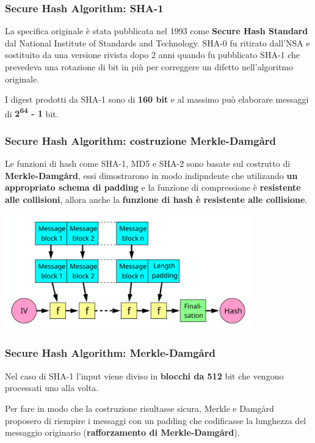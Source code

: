 \begin{frame}
	\frametitle{Secure Hash Algorithm: SHA-1}

	La specifica originale è stata pubblicata nel 1993 come \textbf{Secure Hash Standard} dal National Institute of Standards and Technology.
	SHA-0 fu ritirato dall'NSA e sostituito da una versione rivista dopo 2 anni quando fu pubblicato SHA-1 che prevedeva una rotazione di bit in più
	per correggere un difetto nell'algoritmo originale.

	\vspace{1cm}

	I digest prodotti da SHA-1 sono di \textbf{160 bit} e al massimo può elaborare messaggi di \textbf{2\textsuperscript{64} - 1} bit.
\end{frame}


\begin{frame}
	\frametitle{Secure Hash Algorithm: costruzione Merkle-Damgård}
	Le funzioni di hash come SHA-1, MD5 e SHA-2 sono basate sul costrutto di \textbf{Merkle-Damgård}, essi dimostrarono in modo indipndente
	che utilizando \textbf{un appropriato schema di padding} e la funzione di compressione è \textbf{resistente alle collisioni}, allora anche la \textbf{funzione di hash è resistente alle collisione}.

	\begin{center}
		\includegraphics[width=0.8\textwidth]{img/1-img/Merkle-Damgard.png}
	\end{center}
\end{frame}


\begin{frame}
	\frametitle{Secure Hash Algorithm: Merkle-Damgård}

	Nel caso di SHA-1 l'input viene diviso in \textbf{blocchi da 512} bit che vengono processati uno alla volta.
	
	\vspace{1cm}


	Per fare in modo che la costruzione risultasse sicura, Merkle e Damgård proposero di
	riempire i messaggi con un padding che codificasse la lunghezza del messaggio originario (\textbf{rafforzamento di Merkle-Damgård}).
\end{frame}

